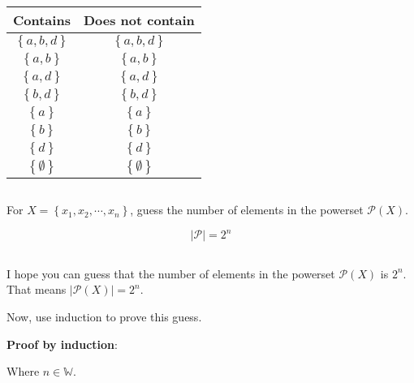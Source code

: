 \documentclass{article}
\begin{document}
\begin{tabular}{ | c | c | }
	\textbf{Contains}              & \textbf{Does not contain}      \\
	\hline
	$ \left\{ a, b, d \right\} $   & $ \left\{ a, b, d \right\} $   \\
	$ \left\{ a, b \right\} $      & $ \left\{ a, b \right\} $      \\
	$ \left\{ a, d \right\} $      & $ \left\{ a, d \right\} $      \\
	$ \left\{ b, d \right\} $      & $ \left\{ b, d \right\} $      \\
	$ \left\{ a \right\} $         & $ \left\{ a \right\} $         \\
	$ \left\{ b \right\} $         & $ \left\{ b \right\} $         \\
	$ \left\{  d \right\} $        & $ \left\{ d \right\}         $ \\
	$ \left\{ \emptyset \right\} $ & $ \left\{ \emptyset \right\} $ \\
\end{tabular}

\subsection{}

For $ X = \left\{ x_1, x_2, \cdots, x_n \right\} $, guess the number of elements in the powerset $ \mathcal{P}(X) $.

\begin{equation*}
	\left| \mathcal{P} \right| = 2^n
\end{equation*}

\subsection{}

I hope you can guess that the number of elements in the powerset $ \mathcal{P}(X) $ is $ 2^n $. That means $ \left| \mathcal{P}(X) \right| = 2^n $.

Now, use induction to prove this guess.

\textbf{Proof by induction}:

Where $ n \in \mathbb{W} $.
\end{document}
